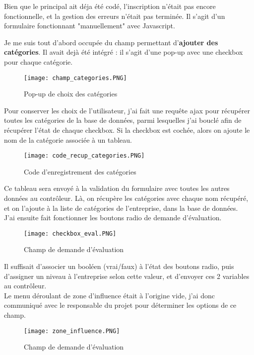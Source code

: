 Bien que le principal ait déja été codé, l'inscription n'était pas encore fonctionnelle, et la gestion des erreurs n'était pas terminée. Il s'agit d'un formulaire fonctionnant "manuellement" avec Javascript.

Je me suis tout d'abord occupée du champ permettant d'\textbf{ajouter des catégories}. Il avait dejà été intégré : il s'agit d'une pop-up avec une checkbox pour chaque catégorie.

\begin{figure}[H]
    \texttt{[image: champ\_categories.PNG]}
    \caption{Pop-up de choix des catégories}
\end{figure}

Pour conserver les choix de l'utilisateur, j'ai fait une requête ajax pour récupérer toutes les catégories de la base de données, parmi lesquelles j'ai bouclé afin de récupérer l'état de chaque checkbox.
Si la checkbox est cochée, alors on ajoute le nom de la catégorie associée à un tableau.

\begin{figure}[H]
    \texttt{[image: code\_recup\_categories.PNG]}
    \caption{Code d'enregistrement des catégories}
\end{figure}

Ce tableau sera envoyé à la validation du formulaire avec toutes les autres données au contrôleur.
Là, on récupère les catégories avec chaque nom récupéré, et on l'ajoute à la liste de catégories de l'entreprise, dans la base de données.\\

J'ai ensuite fait fonctionner les boutons radio de demande d'évaluation.

\begin{figure}[H]
    \texttt{[image: checkbox\_eval.PNG]}
    \caption{Champ de demande d'évaluation}
\end{figure}

Il suffisait d'associer un booléen (vrai/faux) à l'état des boutons radio, puis d'assigner un niveau à l'entreprise selon cette valeur, et d'envoyer ces 2 variables au contrôleur.\\

Le menu déroulant de zone d'influence était à l'origine vide, j'ai donc communiqué avec le responsable du projet pour déterminer les options de ce champ.

\begin{figure}[H]
    \texttt{[image: zone\_influence.PNG]}
    \caption{Champ de demande d'évaluation}
\end{figure}


